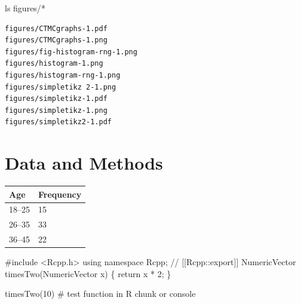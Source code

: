 \documentclass[
  letterpaper,
  DIV=11,
  numbers=noendperiod]{scrartcl}
\newenvironment{Shaded}{\begin{snugshade}}{\end{snugshade}}
\newcommand{\CommentTok}[1]{\textcolor[rgb]{0.37,0.37,0.37}{#1}}
\newcommand{\DecValTok}[1]{\textcolor[rgb]{0.68,0.00,0.00}{#1}}
\newcommand{\FunctionTok}[1]{\textcolor[rgb]{0.28,0.35,0.67}{#1}}
\newcommand{\NormalTok}[1]{\textcolor[rgb]{0.00,0.23,0.31}{#1}}
\newcommand{\PreprocessorTok}[1]{\textcolor[rgb]{0.68,0.00,0.00}{#1}}
\begin{document}
\begin{Shaded}
\begin{Highlighting}[]
\FunctionTok{ls}\NormalTok{ figures/}\PreprocessorTok{*}
\end{Highlighting}
\end{Shaded}

\begin{verbatim}
figures/CTMCgraphs-1.pdf
figures/CTMCgraphs-1.png
figures/fig-histogram-rng-1.png
figures/histogram-1.png
figures/histogram-rng-1.png
figures/simpletikz 2-1.png
figures/simpletikz-1.pdf
figures/simpletikz-1.png
figures/simpletikz2-1.pdf
\end{verbatim}

\hypertarget{sec-data-method}{%
\section{Data and Methods}\label{sec-data-method}}

\begin{tabular}{|l|l|}\hline
Age & Frequency \\ \hline
18--25  & 15 \\
26--35  & 33 \\
36--45  & 22 \\ \hline
\end{tabular}

\begin{Shaded}
\begin{Highlighting}[]
\NormalTok{\#include \textless{}Rcpp.h\textgreater{}}
\NormalTok{using namespace Rcpp;}
\NormalTok{// [[Rcpp::export]]}
\NormalTok{NumericVector timesTwo(NumericVector x) \{}
\NormalTok{  return x * 2;}
\NormalTok{\}}
\end{Highlighting}
\end{Shaded}

\begin{Shaded}
\begin{Highlighting}[]
\FunctionTok{timesTwo}\NormalTok{(}\DecValTok{10}\NormalTok{) }\CommentTok{\# test function in R chunk or console}
\end{Highlighting}
\end{Shaded}
\end{document}
